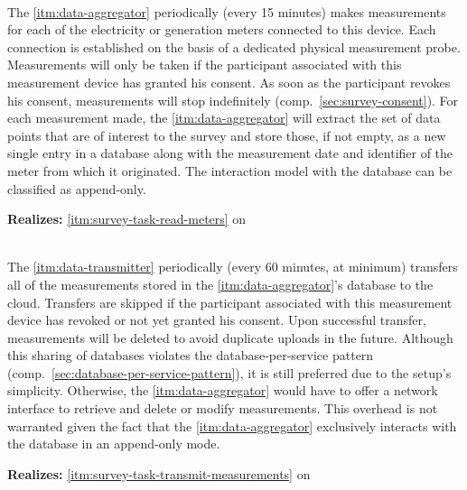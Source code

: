 \begin{description}[format={\storedescriptionlabel}]
  \item[Data Aggregator\label{itm:data-aggregator}]
  \hfill \\
  The \ref{itm:data-aggregator} periodically (every 15 minutes) makes measurements for each of the electricity or generation meters connected to this device. Each connection is established on the basis of a dedicated physical measurement probe. Measurements will only be taken if the participant associated with this measurement device has granted his consent. As soon as the participant revokes his consent, measurements will stop indefinitely (comp.~\autoref{sec:survey-consent}). For each measurement made, the \ref{itm:data-aggregator} will extract the set of data points that are of interest to the survey and store those, if not empty, as a new single entry in a database along with the measurement date and identifier of the meter from which it originated. The interaction model with the database can be classified as append-only.

  \textbf{Realizes:} \ref{itm:survey-task-read-meters} on 

  \item[Data Transmitter\label{itm:data-transmitter}]
  \hfill \\
  The \ref{itm:data-transmitter} periodically (every 60 minutes, at minimum) transfers all of the measurements stored in the \ref{itm:data-aggregator}'s database to the cloud. Transfers are skipped if the participant associated with this measurement device has revoked or not yet granted his consent. Upon successful transfer, measurements will be deleted to avoid duplicate uploads in the future. Although this sharing of databases violates the database-per-service pattern (comp.~\autoref{sec:database-per-service-pattern}), it is still preferred due to the setup's simplicity. Otherwise, the \ref{itm:data-aggregator} would have to offer a network interface to retrieve and delete or modify measurements. This overhead is not warranted given the fact that the \ref{itm:data-aggregator} exclusively interacts with the database in an append-only mode.

  \textbf{Realizes:} \ref{itm:survey-task-transmit-measurements} on 


\end{description}
